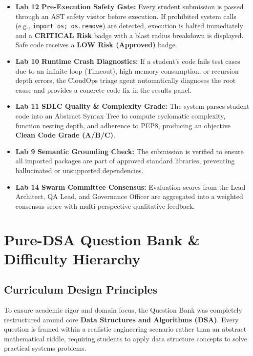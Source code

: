 \documentclass[12pt, a4paper]{report}
\begin{document}
\begin{itemize}[itemsep=4pt,leftmargin=1.5em]
    \item \textbf{Lab 12 Pre-Execution Safety Gate:} Every student submission is passed through an AST safety visitor before execution. If prohibited system calls (e.g., \texttt{import os; os.remove}) are detected, execution is halted immediately and a \textbf{CRITICAL Risk} badge with a blast radius breakdown is displayed. Safe code receives a \textbf{LOW Risk (Approved)} badge.
    \item \textbf{Lab 10 Runtime Crash Diagnostics:} If a student's code fails test cases due to an infinite loop (Timeout), high memory consumption, or recursion depth errors, the CloudOps triage agent automatically diagnoses the root cause and provides a concrete code fix in the results panel.
    \item \textbf{Lab 11 SDLC Quality \& Complexity Grade:} The system parses student code into an Abstract Syntax Tree to compute cyclomatic complexity, function nesting depth, and adherence to PEP8, producing an objective \textbf{Clean Code Grade (A/B/C)}.
    \item \textbf{Lab 9 Semantic Grounding Check:} The submission is verified to ensure all imported packages are part of approved standard libraries, preventing hallucinated or unsupported dependencies.
    \item \textbf{Lab 14 Swarm Committee Consensus:} Evaluation scores from the Lead Architect, QA Lead, and Governance Officer are aggregated into a weighted consensus score with multi-perspective qualitative feedback.
\end{itemize}

\chapter{Pure-DSA Question Bank \& Difficulty Hierarchy}

\section{Curriculum Design Principles}
To ensure academic rigor and domain focus, the Question Bank was completely restructured around core \textbf{Data Structures and Algorithms (DSA)}. Every question is framed within a realistic engineering scenario rather than an abstract mathematical riddle, requiring students to apply data structure concepts to solve practical systems problems.
\end{document}
